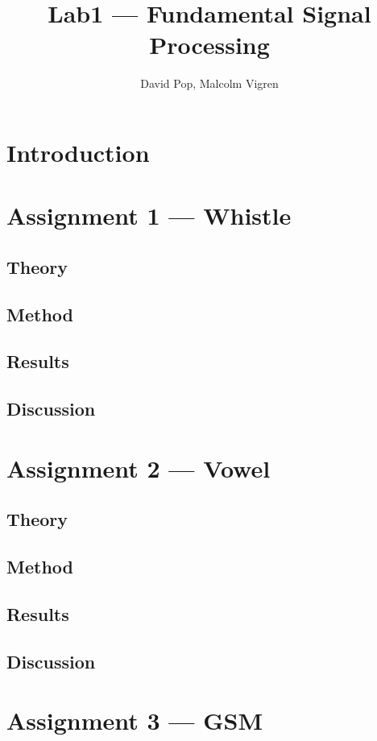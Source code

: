 \documentclass{IEEEtran}
\begin{document}
\title{Lab1 --- Fundamental Signal Processing}
\author{David Pop, Malcolm Vigren}

\maketitle

\section{Introduction}

\section{Assignment 1 --- Whistle}

\subsection{Theory}
\subsection{Method}
\subsection{Results}
\subsection{Discussion}

\section{Assignment 2 --- Vowel}

\subsection{Theory}
\subsection{Method}
\subsection{Results}
\subsection{Discussion}

\section{Assignment 3 --- GSM}
\end{document}
